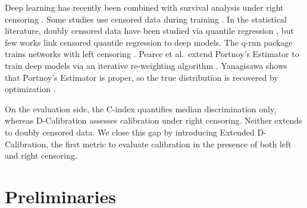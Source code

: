 \documentclass[sigconf]{acmart}
\begin{document}
Deep learning has recently been combined with survival analysis under right censoring \citep{zhong2021deep,katzman2018deepsurv}.
Some studies use censored data during training \citep{avati2020countdown,goldstein2020x}. In the statistical literature, doubly censored data have been studied via quantile regression \citep{lin2012quantile,ji2012quantile,peng2021quantile}, but few works link censored quantile regression to deep models.
The \textsf{q-rnn} package trains networks with left censoring \citep{Cannon2018}.
Pearce et al.\ extend Portnoy's Estimator to train deep models via an iterative re-weighting algorithm \citep{pearce2022censored}.
Yanagisawa shows that Portnoy's Estimator is proper, so the true distribution is recovered by optimization \citep{yanagisawa2023proper}.


On the evaluation side, the C-index \citep{harrell1982evaluating} quantifies median discrimination only, whereas D-Calibration \citep{haider2020effective} assesses calibration under right censoring. Neither extends to doubly censored data. We close this gap by introducing Extended D-Calibration, the first metric to evaluate calibration in the presence of both left and right censoring.


\section{Preliminaries}
\end{document}
